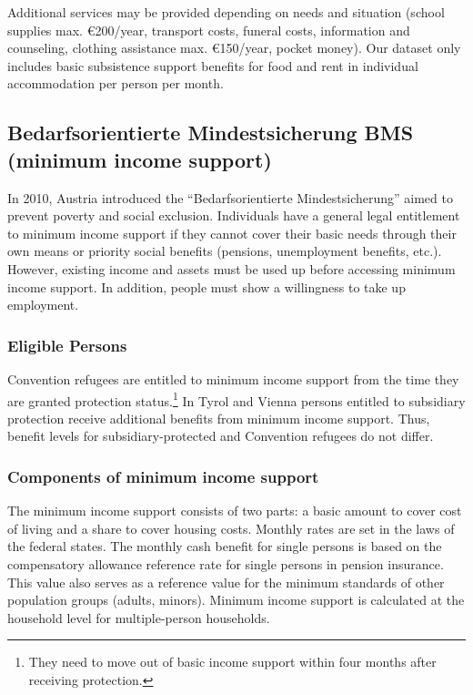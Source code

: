 \noindent Additional services may be provided depending on needs and situation (school supplies max. €200/year, transport costs, funeral costs, information and counseling, clothing assistance max. €150/year, pocket money). Our dataset only includes basic subsistence support benefits for food and rent in individual accommodation per person per month. %

\subsection{Bedarfsorientierte Mindestsicherung BMS (minimum income support)}
In 2010, Austria introduced the ``Bedarfsorientierte Mindestsicherung'' aimed to prevent poverty and social exclusion. Individuals have a general legal entitlement to minimum income support if they cannot cover their basic needs through their own means or priority social benefits (pensions, unemployment benefits, etc.). However, existing income and assets must be used up before accessing minimum income support. In addition, people must show a willingness to take up employment.

\subsubsection{Eligible Persons}
Convention refugees are entitled to minimum income support from the time they are granted protection status.\footnote{They need to move out of basic income support within four months after receiving protection.} In Tyrol and Vienna persons entitled to subsidiary protection receive additional benefits from minimum income support. Thus, benefit levels for subsidiary-protected and Convention refugees do not differ.

\subsubsection{Components of minimum income support}
The minimum income support consists of two parts: a basic amount to cover cost of living and a share to cover housing costs. Monthly rates are set in the laws of the federal states. The monthly cash benefit for single persons is based on the compensatory allowance reference rate for single persons in pension insurance. This value also serves as a reference value for the minimum standards of other population groups (adults, minors). Minimum income support is calculated at the household level for multiple-person households.

